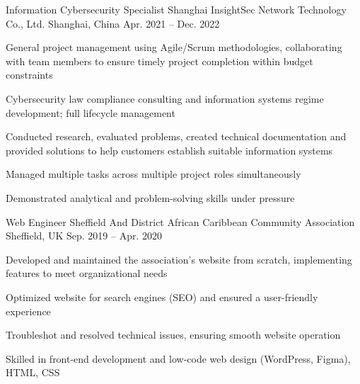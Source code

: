 
\begin{cventries}

  \cventry
    {Information Cybersecurity Specialist} %
    {Shanghai InsightSec Network Technology Co., Ltd.} %
    {Shanghai, China} %
    {Apr. 2021 -- Dec. 2022} %
    {
      \begin{cvitems}
        \item {General project management using Agile/Scrum methodologies, collaborating with team members to ensure timely project completion within budget constraints}
        \item {Cybersecurity law compliance consulting and information systems regime development; full lifecycle management}
        \item {Conducted research, evaluated problems, created technical documentation and provided solutions to help customers establish suitable information systems}
        \item {Managed multiple tasks across multiple project roles simultaneously}
        \item {Demonstrated analytical and problem-solving skills under pressure}
      \end{cvitems}
    }

  \cventry
    {Web Engineer} %
    {Sheffield And District African Caribbean Community Association} %
    {Sheffield, UK} %
    {Sep. 2019 -- Apr. 2020} %
    {
      \begin{cvitems}
        \item {Developed and maintained the association's website from scratch, implementing features to meet organizational needs}
        \item {Optimized website for search engines (SEO) and ensured a user-friendly experience}
        \item {Troubleshot and resolved technical issues, ensuring smooth website operation}
        \item {Skilled in front-end development and low-code web design (WordPress, Figma), HTML, CSS}
      \end{cvitems}
    }

\end{cventries}
